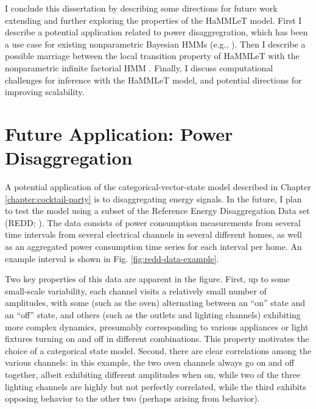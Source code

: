 I conclude this dissertation by describing some directions for future work extending and further exploring the properties of the HaMMLeT model.  First I describe a potential application related to power disaggregration, which has been a use case for existing nonparametric Bayesian HMMs (e.g., \cite{johnson2013bayesian}).  Then I describe a possible marriage between the local transition property of HaMMLeT with the nonparametric infinite factorial HMM \cite{gael2009infinite}.  Finally, I discuss computational challenges for inference with the HaMMLeT model, and potential directions for improving scalability.


\section{Future Application: Power Disaggregation}
\label{sec:power-disaggregation}

A potential application of the categorical-vector-state model described in Chapter \ref{chapter:cocktail-party} is to disaggregating energy signals.  In the future, I plan to test the model using a subset of the Reference Energy Disaggregation Data set (REDD; \citet{kolter2011redd}).  The data consists of power consumption measurements from several time intervals from several electrical channels in several different homes, as well as an aggregated power consumption time series for each interval per home. An example interval is shown in Fig. \ref{fig:redd-data-example}.  

Two key properties of this data are apparent in the figure.  First, up to some small-scale variability, each channel visits a relatively small number of amplitudes, with some (such as the oven) alternating between an ``on'' state and an ``off'' state, and others (such as the outlets and lighting channels) exhibiting more complex dynamics, presumably corresponding to various appliances or light fixtures turning on and off in different combinations.  This property motivates the choice of a categorical state model.  Second, there are clear correlations among the various channels: in this example, the two oven channels always go on and off together, albeit exhibiting different amplitudes when on, while two of the three lighting channels are highly but not perfectly correlated, while the third exhibits opposing behavior to the other two (perhaps arising from behavior).

